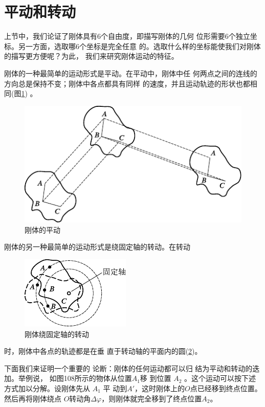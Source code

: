 \section{平动和转动}\label{sec:10.02}

上节中，我们论证了刚体具有$ 6 $个自由度，即描写刚体的几何
位形需要$ 6 $个独立坐标。另一方面，选取哪$ 6 $个坐标是完全任意
的。选取什么样的坐标能使我们对刚体的描写更方便呢？为此，
我们来研究刚体运动的特征。

刚体的一种最简单的运动形式是平动。在平动中，刚体中任
\clearpage\noindent
何两点之间的连线的方向总是保持不变；刚体中各点都具有同样
的速度，并且运动轨迹的形状也都相同(图\ref{fig:10.06}) 。

\begin{figure}[h]
  \centering
  \includegraphics{figure/fig10.06}
  \caption{刚体的平动}
  \label{fig:10.06}
\end{figure}

刚体的另一种最简单的运动形式是绕固定轴的转动。在转动
\begin{figure}
  \centering
  \includegraphics{figure/fig10.07}
  \caption{刚体绕固定轴的转动}
  \label{fig:10.07}
\end{figure}
时，刚体中各点的轨迹都是在垂
直于转动轴的平面内的圆(\ref{fig:10.07})。

下面我们来证明一个重要的
论断：刚体的任何运动都可以归
结为平动和转动的迭加。举例说，
如图108所示的物体从位置$ A _ { 1 } $移
到位置 $ A _ { 2 } $ 。这个运动可以按下述方式加以分解。设刚体先从 $ A _ { 1 } $ 平
动到$ A' $，这时刚体上的$ O $点已经移到终点位置。然后再将刚体绕点
$ O $转动角$ \Delta \varphi $，则刚体就完全移到了终点位置$ A_2 $。

